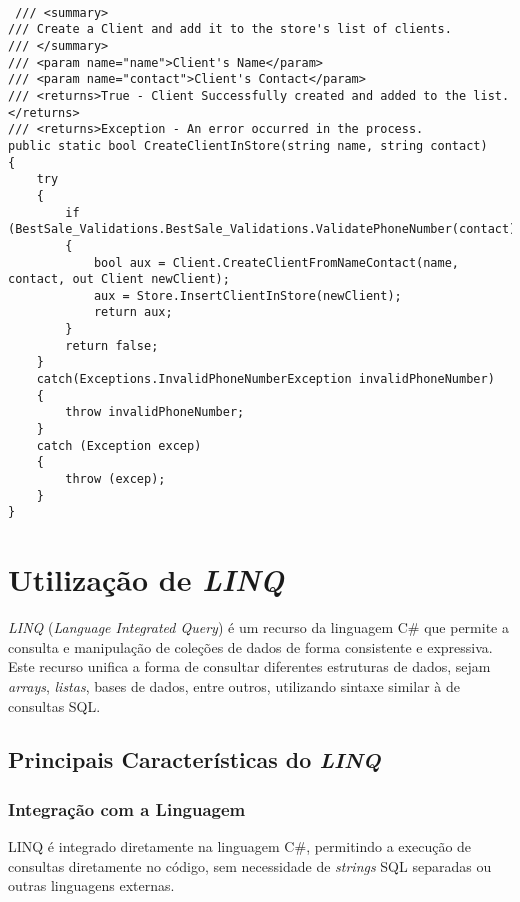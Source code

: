 \documentclass[11pt]{scrartcl} %
\begin{document}
\begin{lstlisting}[language={[Sharp]C}, caption={Exemplo de Utilização de Padrões e Convenções de Estilo}, label={Utilização Padrões Microsoft .NET Coding Conventions}]
	
 /// <summary>
/// Create a Client and add it to the store's list of clients.
/// </summary>
/// <param name="name">Client's Name</param>
/// <param name="contact">Client's Contact</param>
/// <returns>True - Client Successfully created and added to the list.</returns>
/// <returns>Exception - An error occurred in the process.
public static bool CreateClientInStore(string name, string contact)
{
	try
	{
		if (BestSale_Validations.BestSale_Validations.ValidatePhoneNumber(contact))
		{
			bool aux = Client.CreateClientFromNameContact(name, contact, out Client newClient);
			aux = Store.InsertClientInStore(newClient);
			return aux;
		}
		return false;
	}
	catch(Exceptions.InvalidPhoneNumberException invalidPhoneNumber)
	{
		throw invalidPhoneNumber;
	}
	catch (Exception excep)
	{
		throw (excep);
	}
}
\end{lstlisting}

\newpage


\section{Utilização de \textit{LINQ}}
\textit{LINQ} (\textit{Language Integrated Query}) é um recurso da linguagem C\# que permite a consulta e manipulação de coleções de dados de forma consistente e expressiva. Este recurso unifica a forma de consultar diferentes estruturas de dados, sejam \textit{arrays}, \textit{listas}, bases de dados, entre outros, utilizando sintaxe similar à de consultas SQL.

\subsection{Principais Características do \textit{LINQ}}

\subsubsection{Integração com a Linguagem}

LINQ é integrado diretamente na linguagem C\#, permitindo a execução de consultas diretamente no código, sem necessidade de \textit{strings} SQL separadas ou outras linguagens externas.
\end{document}
